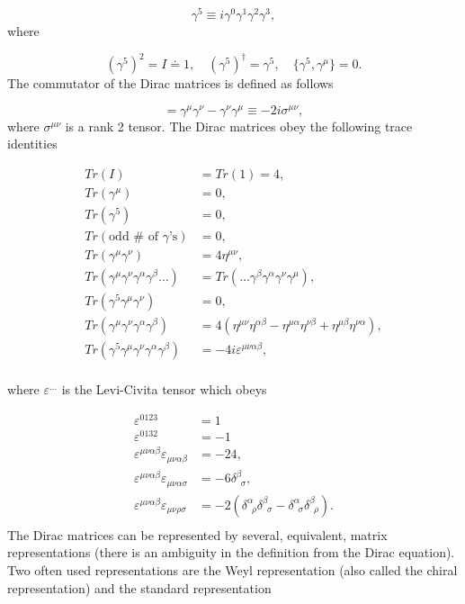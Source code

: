 \begin{equation}
	\gamma^5\equiv i\gamma^0\gamma^1\gamma^2\gamma^3,
\end{equation} 
where

\begin{equation}
	(\gamma^5)^2=I\doteq 1, \quad (\gamma^5)^\dagger=\gamma^5, \quad \{\gamma^5,\gamma^\mu\}=0.
\end{equation} 
The commutator of the Dirac matrices is defined as follows

\begin{equation}
	[\gamma^\mu,\gamma^\nu]=\gamma^\mu\gamma^\nu-\gamma^\nu\gamma^\mu\equiv -2i\sigma^{\mu\nu},
\end{equation} 
where $\sigma^{\mu\nu}$ is a rank 2 tensor. The Dirac matrices obey the following trace identities

\begin{equation}
	\begin{split}
		Tr(I)&=Tr(1)=4,\\
		Tr(\gamma^\mu)&=0,\\
		Tr(\gamma^5)&=0,\\
		Tr(\text{odd $\#$ of $\gamma$'s})&=0,\\
		Tr(\gamma^\mu\gamma^\nu)&=4\eta^{\mu\nu},\\
		Tr(\gamma^\mu\gamma^\nu\gamma^\alpha\gamma^\beta\dots)&=Tr(\dots\gamma^\beta\gamma^\alpha\gamma^\nu\gamma^\mu),\\
		Tr(\gamma^5\gamma^\mu\gamma^\nu)&=0,\\
		Tr(\gamma^\mu\gamma^\nu\gamma^\alpha\gamma^\beta)&=4(\eta^{\mu\nu}\eta^{\alpha\beta}-\eta^{\mu\alpha}\eta^{\nu\beta}+\eta^{\mu\beta}\eta^{\nu\alpha}),\\
		Tr(\gamma^5\gamma^\mu\gamma^\nu\gamma^\alpha\gamma^\beta)&=-4i\varepsilon^{\mu\nu\alpha\beta},\\
	\end{split}
\end{equation} 

where $\varepsilon^{\dots}$ is the Levi-Civita tensor which obeys

\begin{equation}
	\begin{split}
		\varepsilon^{0123}&=1\\
		\varepsilon^{0132}&=-1\\
		\varepsilon^{\mu\nu\alpha\beta}\varepsilon_{\mu\nu\alpha\beta}&=-24,\\
		\varepsilon^{\mu\nu\alpha\beta}\varepsilon_{\mu\nu\alpha\sigma}&=-6\delta^\beta_{\,\,\, \sigma},\\
		\varepsilon^{\mu\nu\alpha\beta}\varepsilon_{\mu\nu\rho\sigma}&=-2(\delta^\alpha_{\,\,\, \rho}\delta^\beta_{\,\,\, \sigma}-\delta^\alpha_{\,\,\, \sigma}\delta^\beta_{\,\,\, \rho}).\\
	\end{split}
\end{equation} 
The Dirac matrices can be represented by several, equivalent, matrix representations (there is an ambiguity in the definition from the Dirac equation). Two often used representations are the Weyl representation (also called the chiral representation) and the standard representation

